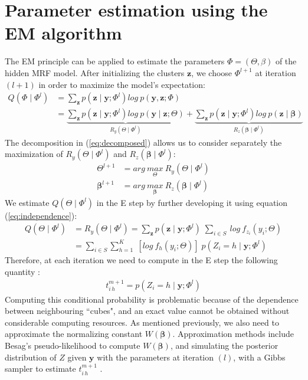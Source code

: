\section{Parameter estimation using the EM algorithm}
The EM principle can be applied to estimate the parameters $\Phi = (\Theta, \beta)$ of the hidden MRF model. After initializing the clusters $\mathbf{z}$,  we choose $\Phi^{l+1}$ at iteration $(l+1)$ in order to maximize the model's expectation:
\begin{align}
Q(\Phi \mid \Phi^{l}) &= \sum\limits_{\mathbf{z}} p(\mathbf{z} \mid \mathbf{y} ; \Phi^{l}) log\:p(\mathbf{y},\mathbf{z};\Phi) \nonumber\\ 
\label{eq:decomposed}
&= \underbrace{\sum\limits_{\mathbf{z}} p(\mathbf{z} \mid \mathbf{y} ; \Phi^{l}) log\:p(\mathbf{y} \mid \mathbf{z} ; \Theta)}_{R_y(\Theta\mid \Phi^l)} + \underbrace{\sum\limits_{\mathbf{z}} p(\mathbf{z} \mid \mathbf{y} ; \Phi^{l}) log\:p(\mathbf{z} \mid \mathbf{\beta})}_{R_z(\mathbf{\beta}\mid \Phi^l)}
\end{align}
The decomposition in (\ref{eq:decomposed}) allows us to consider separately the maximization of $R_y(\Theta\mid \Phi^l)$ and $R_z(\mathbf{\beta}\mid \Phi^l)$:
\begin{align*}
\Theta^{l+1} &= arg\:\underset{\Theta}{max}\:R_y(\Theta\mid \Phi^l)\\
\mathbf{\beta}^{l+1} &= arg\:\underset{\mathbf{\beta}}{max}\:R_z(\mathbf{\beta}\mid \Phi^l)
\end{align*}
We estimate $Q(\Theta \mid \Phi^{l})$ in the E step by further developing it using equation (\ref{eq:independence}):
\begin{align*}
Q(\Theta \mid \Phi^{l}) &= R_y(\Theta\mid \Phi^l) = \sum\limits_{\mathbf{z}} p(\mathbf{z}\mid \mathbf{y} ; \Phi^{l})\;\sum\limits_{i \in S}\: log\: f_{z_i} (y_i ; \Theta)\\
&= \sum\limits_{i \in S} \sum\limits_{h=1}^{K}\; \left[log\: f_{h} (y_i  ; \Theta) \right] \; p(Z_i = h \mid \mathbf{y};\Phi^{l})
\end{align*}  
Therefore, at each iteration we need to compute in the E step the following quantity :
\begin{align*}
t_{i\,h}^{m+1} = p(Z_i = h \mid \mathbf{y};\Phi^{l})
\end{align*}
Computing this conditional probability is problematic because of the dependence between neighbouring ``cubes", and an exact value cannot be obtained without considerable computing resources. As mentioned previously, we also need to approximate the normalizing constant $W(\mathbf{\beta})$. Approximation methods include Besag's pseudo-likelihood \cite{Besag75} to compute $W(\mathbf{\beta})$, and simulating the posterior distribution of $Z$ given $\mathbf{y}$ with the parameters at iteration $(l)$, with a Gibbs sampler to estimate $t_{i\,h}^{m+1}$ \cite{Chalmond89}.\\

